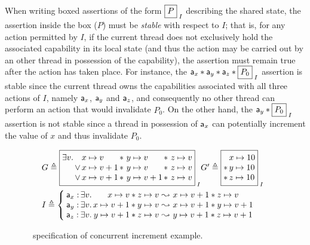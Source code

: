 When writing boxed assertions of the form $\shared{P}{I}$ describing the shared state, the assertion inside the box ($P$) must be \emph{stable} with respect to $I$; that is, for any action permitted by $I$, if the current thread does not exclusively hold the associated capability in its local state (and thus the action may be carried out by an other thread in possession of the capability), the assertion must remain true after the action has taken place. For instance, the $\token a_x * \token a_y * \token a_z * \shared{P_0}{I}$ assertion is stable since the current thread owns the capabilities associated with all three actions of $I$, namely $\mathsf{a}_x$, $\mathsf{a}_y$ and $\mathsf{a}_z$, and consequently no other thread can perform an action that would invalidate $P_0$. On the other hand, the $\token a_y * \shared{P_0}{I}$ assertion is not stable since a thread in possession of $\mathsf{a}_x$ can potentially increment the value of $x$ and thus invalidate $P_0$.
%
%
\begin{figure}
\noindent\makebox[\linewidth]{\rule{\linewidth}{1pt}}
%
\[
\begin{array}{l }
	\hspace*{-0.2cm}
	G \eqdef 
	\shared{
		\begin{array}{@{}l@{}l@{\,}l@{\,}l@{\,}l@{}}
			\exsts{v}   &  & \cell{x}{v}   & *\ \cell{y}{v}  & *\ \cell{z}{v}\\
			& \lor &  \cell{x}{v+1}   & *\ \cell{y}{v}  &*\ \cell{z}{v}\\
			&\lor &  \cell{x}{v+1}   & *\ \cell{y}{v+1}   & *\ \cell{z}{v}
		\end{array}	
				
	}{I}
	
	G' \eqdef 	
	\shared{
		\begin{array}{@{}l@{\,}l@{}}
			  &\cell{x}{10} \\
			* &\cell{y}{10}\\
			* &\cell{z}{10}\\
		\end{array}	
	}{I}
	
	\vspace*{5pt}\\
	

	\hspace*{-0.2cm}
	I \eqdef \left\{
		\hspace*{-0.1cm} 
		\begin{array}{l@{\,}l@{}r@{\ }c@{\ }l}
			\token a_x: & \exsts{v} & \cell{x}{v} * \cell{z}{v} & \swap & \cell{x}{v+1} * \cell{z}{v}\\
			\token a_y: & \exsts{v} & \cell{x}{v+1} * \cell{y}{v} & \swap & \cell{x}{v+1} * \cell{y}{v+1}\\
			\token a_z: & \exsts{v} & \cell{y}{v+1} * \cell{z}{v} & \swap & \cell{y}{v+1} * \cell{z}{v+1}\\
		\end{array}			
	
	\right.

\end{array} 
\]
%
\noindent\makebox[\linewidth]{\rule{\linewidth}{1pt}}
\caption{\colosl\ specification of concurrent increment example.}
\label{fig:concurrentIncCoLoSLSpec}
\end{figure} 
%
%

